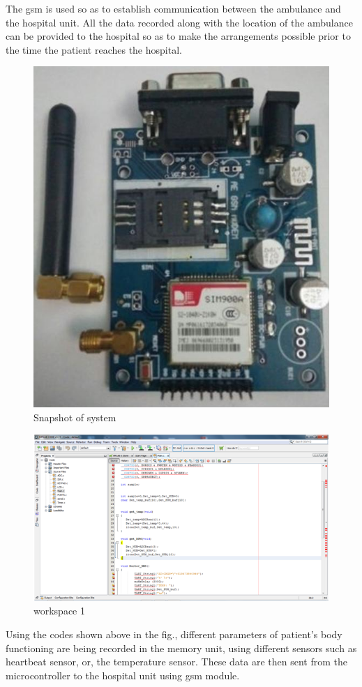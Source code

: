 \documentclass[12pt,a4paper,oneside,openright]{report}
\begin{document}
The gsm is used so as to establish communication between the ambulance and the hospital unit. All the data recorded along with the location of the ambulance can be provided to the hospital so as to make the arrangements possible prior to the time  the patient reaches the hospital.
\begin{figure}[!h]
 \centering
 \includegraphics[height = .70\textwidth, angle=90]{Figures/28.jpg}
 \caption{Snapshot of system}
 \label{Snapshot of system}
\end{figure}

  
\begin{figure}[!h]
 \centering
 \includegraphics[width = \textwidth]{Figures/30.jpg}
 \caption{workspace 1}
 \label{workspace 1}
\end{figure}

Using the codes shown above in the fig., different parameters of patient’s body functioning are being recorded in the memory unit, using different sensors such as heartbeat sensor, or, the temperature sensor. These data are then sent from the microcontroller to the hospital unit using gsm module. 
\end{document}
